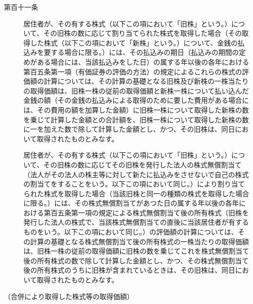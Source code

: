 \documentclass[twocolumn,a4j,10pt]{ltjtarticle}
\begin{document}
\begin{description}
\item[第百十一条]居住者が、その有する株式（以下この項において「旧株」という。）について、その旧株の数に応じて割り当てられた株式を取得した場合（その取得した株式（以下この項において「新株」という。）について、金銭の払込みを要する場合に限る。）には、その払込みの期日（払込みの期間の定めがある場合には、当該払込みをした日）の属する年以後の各年における第百五条第一項（有価証券の評価の方法）の規定によるこれらの株式の評価額の計算については、その計算の基礎となる旧株及び新株の一株当たりの取得価額は、旧株一株の従前の取得価額と新株一株について払い込んだ金銭の額（その金銭の払込みによる取得のために要した費用がある場合には、その費用の額を加算した金額）に旧株一株について取得した新株の数を乗じて計算した金額との合計額を、旧株一株について取得した新株の数に一を加えた数で除して計算した金額とし、かつ、その旧株は、同日において取得されたものとみなす。
\item[]居住者が、その有する株式（以下この項において「旧株」という。）について、その旧株の数に応じてその旧株を発行した法人の株式無償割当て（法人がその法人の株主等に対して新たに払込みをさせないで自己の株式の割当てをすることをいう。以下この項において同じ。）により割り当てられた株式を取得した場合（当該旧株と同一の種類の株式を取得した場合に限る。）には、その株式無償割当てがあつた日の属する年以後の各年における第百五条第一項の規定による株式無償割当て後の所有株式（旧株を発行した法人の株式で、当該株式無償割当ての直後に当該居住者が有するものをいう。以下この項において同じ。）の評価額の計算については、その計算の基礎となる株式無償割当て後の所有株式の一株当たりの取得価額は、旧株一株の従前の取得価額に旧株の数を乗じてこれを株式無償割当て後の所有株式の数で除して計算した金額とし、かつ、その株式無償割当て後の所有株式のうちに旧株が含まれているときは、その旧株は、同日において取得されたものとみなす。
\end{description}
\noindent\hspace{10pt}（合併により取得した株式等の取得価額）
\end{document}
